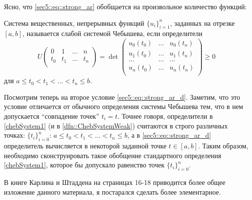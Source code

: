 Ясно, что \eqref{sec5::eq::strong_ar} обобщается на произвольное количество функций:
\begin{dfn}
    \label{dfn::ChebSystemWeak}
    Система вещественных, непрерывных функций $\{u_i\}_{i=1}^n$, заданных на отрезке $[a, b]$,
    называется слабой системой Чебышева, если определители
    $$U\left(
    \begin{array}{cccc}
        0 & 1 & … & n \\
        t_0 & t_1 & … & t_n\\
    \end{array}  \right) = \det \left(
    \begin{array}{ccc}
        u_0(t_0) & … & u_0(t_n) \\
        u_1(t_0) & … & u_1(t_n) \\
        … & … & … \\
        u_n(t_0) & … & u_n(t_n) \\
    \end{array}
    \right) \geqslant 0
    $$
    для $a \leqslant t_0 < t_1 < … < t_n \leqslant b$.
\end{dfn}

Посмотрим теперь на второе условие \eqref{sec5::eq::strong_ar_d}.
Заметим, что это условие отличается от обычного определения системы Чебышева тем, что в нем допускается ``совпадение точек'' $t_i = t$.
Точнее говоря, определители в \ref{chebSystem1} (и в \ref{dfn::ChebSystemWeak})  считаются
в строго различных точках: $\{t_i\}_{i=0}^n$: $a \leqslant t_0 < t_1 < … < t_n \leqslant b$, а в \eqref{sec5::eq::strong_ar_d}
определитель вычисляется в некоторой заданной точке $t \in [a, b]$.
Таким образом, необходимо сконструировать такое обобщение стандартного определения \ref{chebSystem1}, которое бы допускало
равенство точек $\{t_i\}_{i=0}^n$.

{\color{blue} В книге Карлина и Штаддена на страницах 16-18 приводится более общее изложение данного материала, я постарался
сделать более элементарное.}


